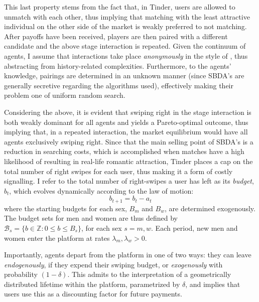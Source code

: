 This last property stems from the fact that, in Tinder, users are allowed to unmatch with each other, thus implying that matching with the least attractive individual on the other side of the market is weakly preferred to not matching. 
After payoffs have been received, players are then paired with a different candidate and the above stage interaction is repeated. Given the continuum of agents, I assume that interactions take place \textit{anonymously} in the style of \cite{jovanovic1988anonymous}, thus abstracting from history-related complexities.
Furthermore, to the agents' knowledge, pairings are determined in an unknown manner (since SBDA's are generally secretive regarding the algorithms used), effectively making their problem one of uniform random search.

Considering the above, it is evident that swiping right in the stage interaction is both weakly dominant for all agents and yields a Pareto-optimal outcome, thus implying that, in a repeated interaction, the market equilibrium would have all agents exclusively swiping right. Since that the main selling point of SBDA's is a reduction in searching costs, which is accomplished when matches have a high likelihood of resulting in real-life romantic attraction, Tinder places a cap on the total number of right swipes for each user, thus making it a form of costly signalling. I refer to the total number of right-swipes a user has left as its \textit{budget}, $b_t$, which evolves dynamically according to the law of motion:
$$
  b_{t+1}= b_{t}- a_{t}
$$
where the starting budgets for each sex, $B_m$ and $B_w$, are determined exogenously. The budget sets for men and women are thus defined by $\mathcal{B}_{s}=\{b \in \mathbb{Z} : 0\leq b \leq B_s\}$, for each sex $s=m,w$. Each period, new men and women enter the platform at rates $\lambda_m, \lambda_w>0$.
\begin{comment}
    , with their attractiveness drawn i.i.d from distributions with cumulative distribution functions $F_m$ and $F_w$, respectively
\end{comment}
Importantly, agents depart from the platform in one of two ways: they can leave \textit{endogenously}, if they expend their swiping budget, or \textit{exogenously} with probability $(1-\delta)$. This admits to the interpretation of a geometrically distributed lifetime within the platform, parametrized by $\delta$, and implies that users use this as a discounting factor for future payments.

